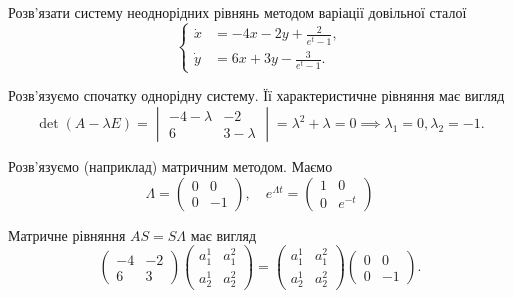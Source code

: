 \begin{example}
	Розв'язати систему неоднорідних рівнянь методом варіації довільної сталої
	\begin{equation*}
		\left\{
			\begin{aligned}
				\dot x &= - 4 x - 2 y + \frac{2}{e^t - 1}, \\
				\dot y &= 6 x + 3 y - \frac{3}{e^t - 1}.
			\end{aligned}
		\right.
	\end{equation*}
\end{example}

\begin{solution}
	Розв'язуємо спочатку однорідну систему. Її характеристичне рівняння має вигляд
	\begin{equation*}
		\det (A - \lambda E) = \begin{vmatrix} - 4 - \lambda & -2 \\ 6 & 3 - \lambda \end{vmatrix} = \lambda^2 + \lambda = 0 \implies \lambda_1 = 0, \lambda_2 = -1.
	\end{equation*}

	Розв'язуємо (наприклад) матричним методом. Маємо
	\begin{equation*}
		\Lambda = \begin{pmatrix}
			0 & 0 \\ 0 & -1
		\end{pmatrix}, \quad 
		e^{\Lambda t} = \begin{pmatrix}
			1 & 0 \\ 0 & e^{-t}
		\end{pmatrix}
	\end{equation*}

	Матричне рівняння $A S = S \Lambda$ має вигляд
	\begin{equation*}
		\begin{pmatrix} -4 & -2 \\ 6 & 3 \end{pmatrix} \begin{pmatrix} a_1^1 & a_1^2 \\ a_2^1 & a_2^2 \end{pmatrix} = \begin{pmatrix} a_1^1 & a_1^2 \\ a_2^1 & a_2^2 \end{pmatrix} \begin{pmatrix} 0 & 0 \\ 0 & -1 \end{pmatrix}.
	\end{equation*}


\end{solution}
